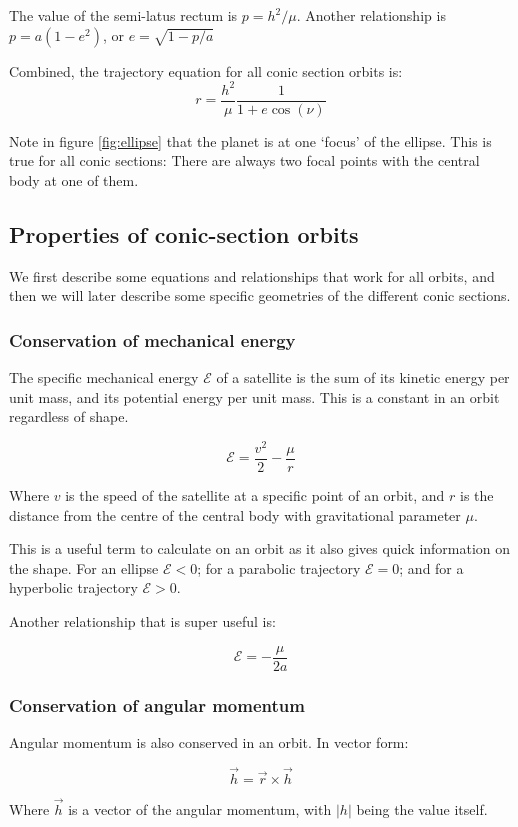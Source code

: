\documentclass{report}
\begin{document}
The value of the semi-latus rectum is $p=h^2 /\mu$. Another relationship is $p = a(1-e^2 )$, or $e=\sqrt{1-p/a}$

Combined, the trajectory equation for all conic section orbits is:
$$
r = \frac{h^2}{\mu}\frac{1}{1+e\cos{(\nu)}}
$$

Note in figure \ref{fig:ellipse} that the planet is at one `focus' of the ellipse. This is true for all conic sections: There are always two focal points with the central body at one of them.

\subsection{Properties of conic-section orbits}

We first describe some equations and relationships that work for all orbits, and then we will later describe some specific geometries of the different conic sections.

\subsubsection{Conservation of mechanical energy}
The specific mechanical energy $\mathcal{E}$ of a satellite is the sum of its kinetic energy per unit mass, and its potential energy per unit mass. This is a constant in an orbit regardless of shape. 

$$
\mathcal{E} = \frac{v^2}{2}-\frac{\mu}{r}
$$

Where $v$ is the speed of the satellite at a specific point of an orbit, and $r$ is the distance from the centre of the central body with gravitational parameter $\mu$.

This is a useful term to calculate on an orbit as it also gives quick information on the shape. For an ellipse $\mathcal{E}<0$; for a parabolic trajectory $\mathcal{E}=0$; and for a hyperbolic trajectory $\mathcal{E}>0$.

Another relationship that is super useful is:

$$
\mathcal{E} = -\frac{\mu}{2a}
$$

\subsubsection{Conservation of angular momentum}
Angular momentum is also conserved in an orbit. In vector form:

$$
\vec{h} = \vec{r} \times \vec{h}
$$

Where $\vec{h}$ is a vector of the angular momentum, with $|h|$ being the value itself.
\end{document}
